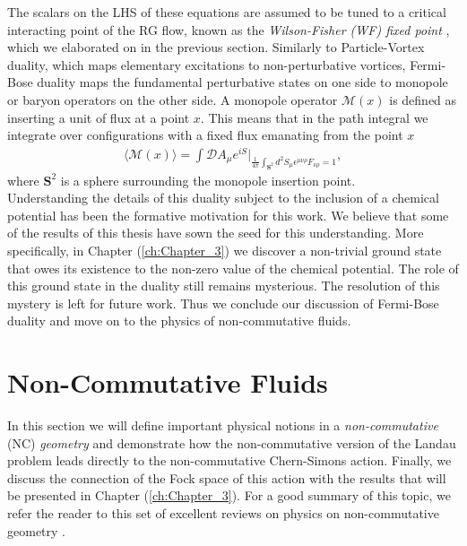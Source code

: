             The scalars on the LHS of these equations are assumed to be tuned to a critical interacting point of the RG flow, known as the \textit{Wilson-Fisher (WF) fixed point} \cite{Wilson:1971dc}, which we elaborated on in the previous section. Similarly to Particle-Vortex duality, which maps elementary excitations to non-perturbative vortices, Fermi-Bose duality maps the fundamental perturbative states on one side to monopole or baryon operators on the other side. A monopole operator $\mathcal{M}(x)$ is defined as inserting a unit of flux at a point $x$. This means that in the path integral we integrate over configurations with a fixed flux emanating from the point $x$ \\
\begin{align}
     \langle \mathcal{M}(x) \rangle = \int \mathcal{D}A_{\mu} e^{i S}\bigg |_{\frac{1}{4\pi} \int_{\textbf{S}^2} d^2S_{\mu} \epsilon^{\mu \nu \rho}F_{\nu \rho} =1}, 
\end{align}
    where $\mathbf{S}^2$ is a sphere surrounding the monopole insertion point. \\
            \indent Understanding the details of this duality subject to the inclusion of a chemical potential has been the formative motivation for this work. We believe that some of the results of this thesis have sown the seed for this understanding. More specifically, in Chapter (\ref{ch:Chapter_3}) we discover a non-trivial ground state that owes its existence to the non-zero value of the chemical potential. The role of this ground state in the duality still remains mysterious. The resolution of this mystery is left for future work. Thus we conclude our discussion of Fermi-Bose duality and move on to the physics of non-commutative fluids.
%
        \section{Non-Commutative Fluids}
    In this section we will define important physical notions in a \textit{non-commutative} (NC) \textit{geometry} and demonstrate how the non-commutative version of the Landau problem leads directly to the non-commutative Chern-Simons action. Finally, we discuss the connection of the Fock space of this action with the results that will be presented in Chapter (\ref{ch:Chapter_3}). For a good summary of this topic, we refer the reader to this set of excellent reviews on physics on non-commutative geometry \cite{Polychronakos:2007df, Szabo:2001kg, Douglas:2001ba}.


